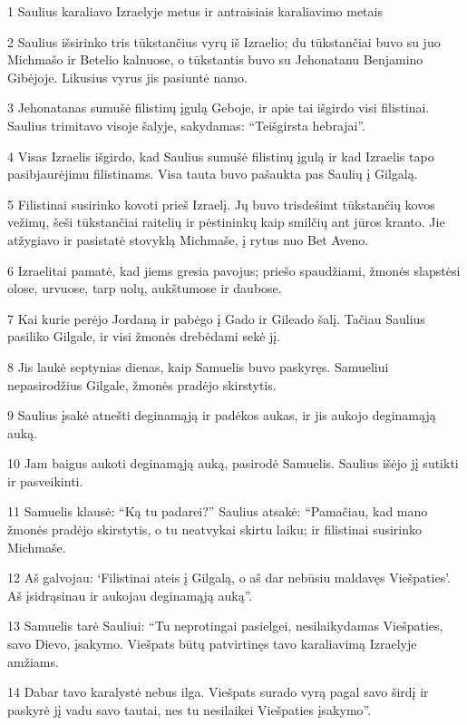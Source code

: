 \par 1 Saulius karaliavo Izraelyje metus ir antraisiais karaliavimo metais 
\par 2 Saulius išsirinko tris tūkstančius vyrų iš Izraelio; du tūkstančiai buvo su juo Michmašo ir Betelio kalnuose, o tūkstantis buvo su Jehonatanu Benjamino Gibėjoje. Likusius vyrus jis pasiuntė namo. 
\par 3 Jehonatanas sumušė filistinų įgulą Geboje, ir apie tai išgirdo visi filistinai. Saulius trimitavo visoje šalyje, sakydamas: “Teišgirsta hebrajai”. 
\par 4 Visas Izraelis išgirdo, kad Saulius sumušė filistinų įgulą ir kad Izraelis tapo pasibjaurėjimu filistinams. Visa tauta buvo pašaukta pas Saulių į Gilgalą. 
\par 5 Filistinai susirinko kovoti prieš Izraelį. Jų buvo trisdešimt tūkstančių kovos vežimų, šeši tūkstančiai raitelių ir pėstininkų kaip smilčių ant jūros kranto. Jie atžygiavo ir pasistatė stovyklą Michmaše, į rytus nuo Bet Aveno. 
\par 6 Izraelitai pamatė, kad jiems gresia pavojus; priešo spaudžiami, žmonės slapstėsi olose, urvuose, tarp uolų, aukštumose ir daubose. 
\par 7 Kai kurie perėjo Jordaną ir pabėgo į Gado ir Gileado šalį. Tačiau Saulius pasiliko Gilgale, ir visi žmonės drebėdami sekė jį. 
\par 8 Jis laukė septynias dienas, kaip Samuelis buvo paskyręs. Samueliui nepasirodžius Gilgale, žmonės pradėjo skirstytis. 
\par 9 Saulius įsakė atnešti deginamąją ir padėkos aukas, ir jis aukojo deginamąją auką. 
\par 10 Jam baigus aukoti deginamąją auką, pasirodė Samuelis. Saulius išėjo jį sutikti ir pasveikinti. 
\par 11 Samuelis klausė: “Ką tu padarei?” Saulius atsakė: “Pamačiau, kad mano žmonės pradėjo skirstytis, o tu neatvykai skirtu laiku; ir filistinai susirinko Michmaše. 
\par 12 Aš galvojau: ‘Filistinai ateis į Gilgalą, o aš dar nebūsiu maldavęs Viešpaties’. Aš įsidrąsinau ir aukojau deginamąją auką”. 
\par 13 Samuelis tarė Sauliui: “Tu neprotingai pasielgei, nesilaikydamas Viešpaties, savo Dievo, įsakymo. Viešpats būtų patvirtinęs tavo karaliavimą Izraelyje amžiams. 
\par 14 Dabar tavo karalystė nebus ilga. Viešpats surado vyrą pagal savo širdį ir paskyrė jį vadu savo tautai, nes tu nesilaikei Viešpaties įsakymo”. 
